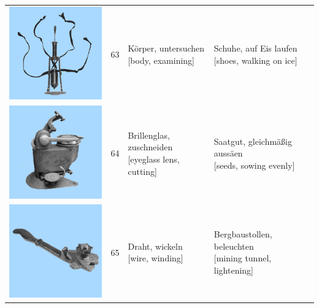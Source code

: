 \documentclass[
  english,
  doc,12pt,twoside,floatsintext]{apa7}
\begin{document}
\begin{center}
\begin{ThreePartTable}
{\begin{longtable}{llll}
\includegraphics[valign=c, scale=0.23]{../materials/unfamiliar/63.png} & 63 & \makecell[l]{Körper, untersuchen\\{[body, examining]}} & \makecell[l]{Schuhe, auf Eis laufen\\{[shoes, walking on ice]}}\\
\includegraphics[valign=c, scale=0.23]{../materials/unfamiliar/64.png} & 64 & \makecell[l]{Brillenglas, zuschneiden\\{[eyeglass lens, cutting]}} & \makecell[l]{Saatgut, gleichmäßig aussäen\\{[seeds, sowing evenly]}}\\
\includegraphics[valign=c, scale=0.23]{../materials/unfamiliar/65.png} & 65 & \makecell[l]{Draht, wickeln\\{[wire, winding]}} & \makecell[l]{Bergbaustollen, beleuchten\\{[mining tunnel, lightening]}}\\

\end{longtable}}
\end{ThreePartTable}
\end{center}
\end{document}

